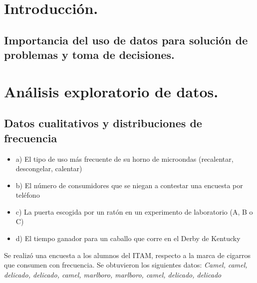 \documentclass{../oxmathproblems}
\begin{document}
\begin{questions}

\section{Introducción.} 

\subsection {Importancia del uso de datos para solución de problemas y toma de decisiones.}





\section{Análisis exploratorio de datos.} 


\subsection{Datos cualitativos y distribuciones de frecuencia}


\begin{itemize}

\item a) El tipo de uso más frecuente de su horno de microondas (recalentar, descongelar, calentar)

\item b) El número de consumidores que se niegan a contestar una encuesta por teléfono 

\item c) La puerta escogida por un ratón en un experimento de laboratorio (A, B o C)

\item d) El tiempo ganador para un caballo que corre en el Derby de Kentucky 

\end{itemize}





\miquestion Se realizó una encuesta a los alumnos del ITAM, respecto a la marca de cigarros que consumen con frecuencia. Se obtuvieron los siguientes datos: 
\textit{Camel, camel, delicado, delicado, camel, marlboro, marlboro, camel, delicado, delicado}


\end{questions}
\end{document}
